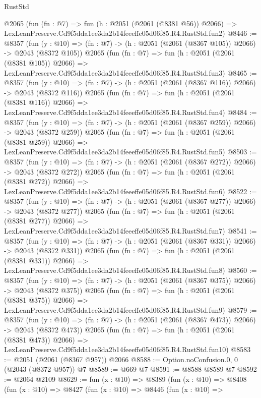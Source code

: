 \begin{lexlean}{RustStd}
\begin{coremodule}
    @2065
    (fun (fn : @7) =>
    fun (h : @2051 (@2061 (@8381 @56)) @2066) =>
    LexLeanPreserve.Cd9f5dda1ee3da2b14feeeffe05d06f85.R4.RustStd.fun2)
@8446 := @8357
    (fun (y : @10) => (fn : @7) -> (h : @2051 (@2061 (@8367 @105)) @2066) -> @2043 (@8372 @105))
    @2065
    (fun (fn : @7) =>
    fun (h : @2051 (@2061 (@8381 @105)) @2066) =>
    LexLeanPreserve.Cd9f5dda1ee3da2b14feeeffe05d06f85.R4.RustStd.fun3)
@8465 := @8357
    (fun (y : @10) => (fn : @7) -> (h : @2051 (@2061 (@8367 @116)) @2066) -> @2043 (@8372 @116))
    @2065
    (fun (fn : @7) =>
    fun (h : @2051 (@2061 (@8381 @116)) @2066) =>
    LexLeanPreserve.Cd9f5dda1ee3da2b14feeeffe05d06f85.R4.RustStd.fun4)
@8484 := @8357
    (fun (y : @10) => (fn : @7) -> (h : @2051 (@2061 (@8367 @259)) @2066) -> @2043 (@8372 @259))
    @2065
    (fun (fn : @7) =>
    fun (h : @2051 (@2061 (@8381 @259)) @2066) =>
    LexLeanPreserve.Cd9f5dda1ee3da2b14feeeffe05d06f85.R4.RustStd.fun5)
@8503 := @8357
    (fun (y : @10) => (fn : @7) -> (h : @2051 (@2061 (@8367 @272)) @2066) -> @2043 (@8372 @272))
    @2065
    (fun (fn : @7) =>
    fun (h : @2051 (@2061 (@8381 @272)) @2066) =>
    LexLeanPreserve.Cd9f5dda1ee3da2b14feeeffe05d06f85.R4.RustStd.fun6)
@8522 := @8357
    (fun (y : @10) => (fn : @7) -> (h : @2051 (@2061 (@8367 @277)) @2066) -> @2043 (@8372 @277))
    @2065
    (fun (fn : @7) =>
    fun (h : @2051 (@2061 (@8381 @277)) @2066) =>
    LexLeanPreserve.Cd9f5dda1ee3da2b14feeeffe05d06f85.R4.RustStd.fun7)
@8541 := @8357
    (fun (y : @10) => (fn : @7) -> (h : @2051 (@2061 (@8367 @331)) @2066) -> @2043 (@8372 @331))
    @2065
    (fun (fn : @7) =>
    fun (h : @2051 (@2061 (@8381 @331)) @2066) =>
    LexLeanPreserve.Cd9f5dda1ee3da2b14feeeffe05d06f85.R4.RustStd.fun8)
@8560 := @8357
    (fun (y : @10) => (fn : @7) -> (h : @2051 (@2061 (@8367 @375)) @2066) -> @2043 (@8372 @375))
    @2065
    (fun (fn : @7) =>
    fun (h : @2051 (@2061 (@8381 @375)) @2066) =>
    LexLeanPreserve.Cd9f5dda1ee3da2b14feeeffe05d06f85.R4.RustStd.fun9)
@8579 := @8357
    (fun (y : @10) => (fn : @7) -> (h : @2051 (@2061 (@8367 @473)) @2066) -> @2043 (@8372 @473))
    @2065
    (fun (fn : @7) =>
    fun (h : @2051 (@2061 (@8381 @473)) @2066) =>
    LexLeanPreserve.Cd9f5dda1ee3da2b14feeeffe05d06f85.R4.RustStd.fun10)
@8583 := @2051 (@2061 (@8367 @957)) @2066
@8588 := Option.noConfusion.{0, 0} (@2043 (@8372 @957)) @7
@8589 := @669 @7
@8591 := @8588 @8589 @7
@8592 := @2064 @2109
@8629 := fun (x : @10) =>
  @8389
    (fun (x : @10) =>
    @8408
      (fun (x : @10) =>
      @8427
        (fun (x : @10) =>
        @8446
          (fun (x : @10) =>

\end{coremodule}
\end{lexlean}
